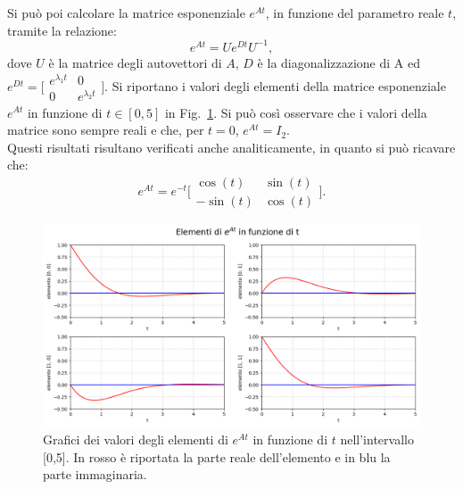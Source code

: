 \documentclass[a4paper]{article}
\newcounter{count_es}
\newcounter{count_sub_es}[count_es]
\renewcommand{\figurename}{Fig.}
\begin{document}
Si può poi calcolare la matrice esponenziale \(e^{At}\),
in funzione del parametro reale \(t\), tramite la relazione:
\[e^{At} = Ue^{Dt}U^{-1},\] 
dove \(U\) è la matrice degli autovettori di \(A\), \(D\) è
la diagonalizzazione di A ed 
\(e^{Dt} = \bigl[\begin{smallmatrix} e^{\lambda_{1}t}&0 \\ 0&e^{\lambda_{2}t} \end{smallmatrix}\bigr]\).
Si riportano i valori degli elementi della matrice esponenziale 
\(e^{At}\) in funzione di \(t\in[0,5]\) in \figurename~\ref{fig:es_1a}. Si può così osservare
che i valori della matrice sono sempre reali e che, per \(t=0\), \(e^{At} = I_{2}\). 
\\Questi risultati risultano verificati anche analiticamente, in quanto si 
può ricavare che:
\[e^{At} = e^{-t}\bigl[\begin{smallmatrix}
    \cos(t)&\sin(t)\\-\sin(t)&\cos(t)
\end{smallmatrix}\bigr].\]
\begin{figure}[H]
    \centering
    \includegraphics[width=.95\linewidth]{Es_1a.png}
    \caption{Grafici dei valori degli elementi di \(e^{At}\) in funzione di 
    \(t\) nell'intervallo [0,5]. In rosso è riportata la parte reale dell'elemento
    e in blu la parte immaginaria. \label{fig:es_1a}}
\end{figure}
\end{document}
